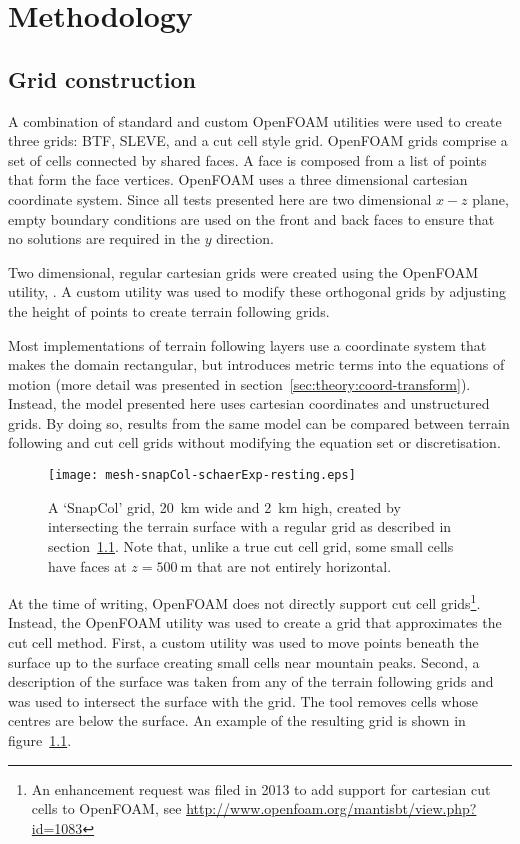 \chapter{Methodology}

\section{Grid construction}
\label{sec:method:grid}

A combination of standard and custom OpenFOAM utilities were used to create three grids: BTF, SLEVE, and a cut cell style grid.  OpenFOAM grids comprise a set of cells connected by shared faces.  A face is composed from a list of points that form the face vertices.
OpenFOAM uses a three dimensional cartesian coordinate system.  Since all tests presented here are two dimensional $x-z$ plane, empty boundary conditions are used on the front and back faces to ensure that no solutions are required in the $y$ direction.

Two dimensional, regular cartesian grids were created using the OpenFOAM utility, .  A custom utility was used to modify these orthogonal grids by adjusting the height of points to create terrain following grids.

Most implementations of terrain following layers use a coordinate system that makes the domain rectangular, but introduces metric terms into the equations of motion (more detail was presented in section~\ref{sec:theory:coord-transform}).  Instead, the model presented here uses cartesian coordinates and unstructured grids.  By doing so, results from the same model can be compared between terrain following and cut cell grids without modifying the equation set or discretisation.

\begin{figure}
\centerfloat
\texttt{[image: mesh-snapCol-schaerExp-resting.eps]}
\caption{A `SnapCol' grid, \SI{20}{\kilo\meter} wide and \SI{2}{\kilo\meter} high, created by intersecting the terrain surface with a regular grid as described in section~\ref{sec:method:grid}.  Note that, unlike a true cut cell grid, some small cells have faces at $z = \SI{500}{\meter}$ that are not entirely horizontal.}
\label{fig:method:cut-cell}
\end{figure}

At the time of writing, OpenFOAM does not directly support cut cell grids\footnote{An enhancement request was filed in 2013 to add support for cartesian cut cells to OpenFOAM, see \url{http://www.openfoam.org/mantisbt/view.php?id=1083}}.  Instead, the  OpenFOAM utility was used to create a grid that approximates the cut cell method.  First, a custom utility was used to move points beneath the surface up to the surface creating small cells near mountain peaks.  Second, a description of the surface was taken from any of the terrain following grids and  was used to intersect the surface with the grid.  The tool removes cells whose centres are below the surface.  An example of the resulting grid is shown in figure~\ref{fig:method:cut-cell}.


